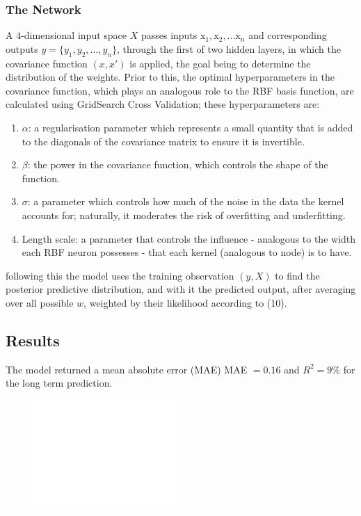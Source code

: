 \documentclass[12pt,a4paper]{article}
\begin{document}
\subsubsection{The Network}

A $4$-dimensional input space $X$
passes inputs $\boldsymbol{\mathrm{x}}_1, \boldsymbol{\mathrm{x}}_2,\ldots \boldsymbol{\mathrm{x}}_{n}$
and corresponding outputs \( y = \{y_1, y_2, \dots, y_n\} \), through the first
of two hidden layers, in which the covariance function $(x,x')$
is applied, the goal being to determine the distribution of the weights. Prior to this,
the optimal hyperparameters in the covariance function, which plays an analogous
role to the RBF basis function, are calculated using GridSearch Cross Validation; these hyperparameters are:
\begin{enumerate}
    \item $\alpha$: a regularisation parameter which represents a small quantity
    that is added to the diagonals of the covariance matrix to ensure it is 
    invertible. 
    \item $\beta$: the power in the covariance function, which controls the shape of the function.
    \item $\sigma$: a parameter which controls how much of the noise in the data the kernel accounts for; naturally, 
    it moderates the risk of overfitting and underfitting.
    \item Length scale: a parameter that controls the influence - analogous to 
    the width each RBF neuron possesses - that each kernel (analogous to node) is to have.
\end{enumerate}
following this the model uses the training observation $(y,X)$ to find
the posterior predictive distribution, and with it the predicted output, after 
averaging over all possible $w$, weighted by their likelihood according to (10). 

\subsection{Results}

The model returned a mean absolute error (MAE)  MAE $=0.16$ and 
$R^2 = 9\%$ for the long term prediction.


\begin{figure}[h]
    \centering
    \includegraphics[width=0.5\textwidth]{short-term.png}
    \caption{}
    \label{fig:}
\end{figure}
\end{document}
